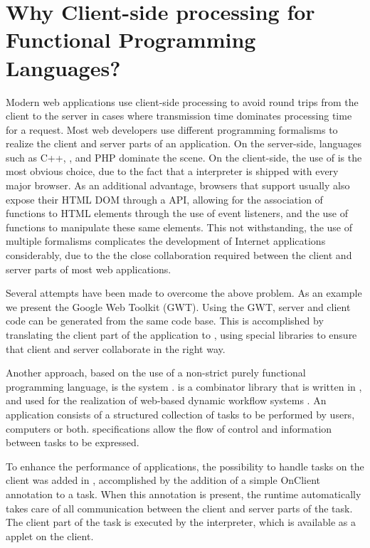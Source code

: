 \section{Why Client-side processing for Functional Programming Languages?}
\label{sapljs:sec:motivation}
Modern web applications use client-side processing to avoid round trips from the
client to the server in cases where transmission time dominates processing time 
for a request. Most web developers use different programming formalisms to
realize the client and server parts of an application. On the server-side,
languages such as \textsf{C++}, \Java, and \textsf{PHP} dominate the scene.
On the client-side, the use of \JS is the most obvious choice, due to the fact
that a \JS interpreter is shipped with every major browser. As an additional
advantage, browsers that support \JS usually also expose their \textsf{HTML}
\textsf{DOM} through a \JS API, allowing for the association of \JS functions to
\textsf{HTML} elements through the use of event listeners, and the use of \JS
functions to manipulate these same elements. This not withstanding, the use of
multiple formalisms complicates the development of Internet applications
considerably, due to the the close collaboration required between the client and
server parts of most web applications.

Several attempts have been made to overcome the above problem. As an example we
present the Google Web Toolkit (\textsf{GWT}). Using the GWT, server and client
code can be generated from the same \Java code base. This is accomplished
by translating the client part of the application to \JS, using special
libraries to ensure that client and server collaborate in the right way.

Another approach, based on the use of a non-strict purely functional programming
language, is the \iTask system \cite{ITASK}. \iTask is a combinator library
that is written in \Clean, and used for the realization of web-based dynamic
workflow systems \cite{LDTA2010}. An \iTask application consists of a structured
collection of tasks to be performed by users, computers or both. \iTask
specifications allow the flow of control and information between tasks to be
expressed. 

To enhance the performance of \iTask applications, the possibility to handle
tasks on the client was added in \cite{ITASK_AJAX}, accomplished by the
addition of a simple \textsf{OnClient} annotation to a task. When this
annotation is present, the \iTask runtime automatically takes care of all
communication between the client and server parts of the task. The client part
of the task is executed by the \Sapl interpreter, which is available as a \Java 
applet on the client.

